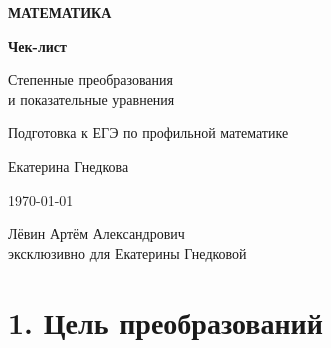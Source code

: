 \documentclass[a4paper,12pt]{article}
\newcommand{\sectionline}{%
    \par\noindent{\color{accent}\rule{\linewidth}{0.7pt}}\par
}
\begin{document}

\begin{titlepage}
\thispagestyle{empty}

\begin{center}
\vspace*{22mm}

{\color{darkaccent}\Large\bfseries МАТЕМАТИКА}

\vspace{17mm}

{\Huge\bfseries Чек-лист}

\vspace{7mm}

{\LARGE\color{accent}
Степенные преобразования\\[2mm]
и показательные уравнения}

\vspace{16mm}

{\large Подготовка к ЕГЭ по профильной математике}

\vfill

{\large Екатерина Гнедкова}

\vspace{9mm}

{\large \today}

\vspace{16mm}

{\small
Лёвин Артём Александрович\\
эксклюзивно для Екатерины Гнедковой}

\vspace{16mm}


\end{center}
\end{titlepage}


\section*{\color{darkaccent}1. Цель преобразований}
\sectionline
\end{document}
